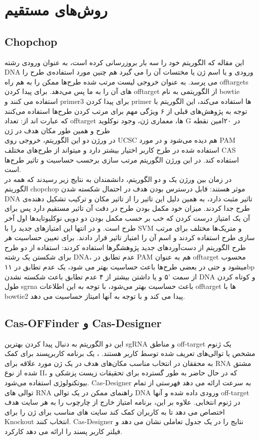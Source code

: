 \documentclass[12pt,a4paper,BCOR=.7cm,headsepline,bibliography=totoc]{report}
\begin{document}
\section{روش‌های مستقیم}
\subsection{Chopchop ~\cite{CHOPCHOP3,CHOPCHOP2,CHOPCHOP}}
این مقاله که الگوریتم خود را سه بار بروزرسانی کرده است، به عنوان ورودی رشته DNA ورودی و یا اسم ژن یا مختسات آن را می گیرد هم چنین مورد استفاده‌ی طرح را می پرسد. به عنوان خروجی لیست مرتب شده طرح‌ها ممکن را به هم راه offtargets های آن را به ما پس می‌دهد. برای پیدا کردن offtarget از الگوریتمی به نام bowtie استفاده می کنند و primer3 برای پیدا کردن primer ها استفاده می‌کند، این الگوریتم با توجه به پژوهش‌های قبلی از ۶ ویژگی مهم برای مرتب کردن طرح‌ها استفاده می‌کنند که عبارت اند از: تعداد offtarget ها، معماری ژن،  وجود نوکلوید G در ۲۰امین نقطه طرح و همین طور مکان هدف در ژن \\
در ورژن دو این الگوریتم، خروجی روی UCSC هم دیده می‌شود و در مورد PAM استفاده شده در طرح کاربر اختیار بیشتر دارد و میتواند از طرح‌های مختلف CAS استفاده کند. در این ورژن الگوریتم مرتب سازی برحسب حساسیت و تاثیر طرح‌ها است.\\
در زمان بین ورژن یک و دو الگوریتم، دانشمندان به نتایج زیر رسیدند که همه در الگوریتم chopchop موثر هستند: قابل درسترس بودن هدف در احتمال شکسته شدن DNA تاثیر مثبت دارد، به همین دلیل این تاثیر را از تاثیر مکان و ترکیب تشکیل دهنده‌ی طرح جدا کردند.
میزان خود مکمل بودن طرح در دقت آن تاثیر مستقیم دارد پس برای آن یک امتیاز درست کردن که خب بر حسب مکمل بودن دو دویی نوکلیوتاید‌ها اول آخر طرح است. و در انتها این امتیاز‌های جدید را با SVM و متریک‌ها مختلف برای مرتب سازی طرح استفاده کردند و اسم آن را امتیاز تاثیر قرار دادند.
برای تعیین حساسیت هر طرح الگوریتم از دست‌آورد‌های جدید پژوهشگر‌ها استفاده کردند: استفاده از دو طرح برای شکستن یک رشته DNA، عدم تطابق در PAM هم به عنوان offtarget محسوب میشود و حتی در بعضی طرح‌ها باعث حساسیت بهتر می شود، یک عدم تطابق در ۱۱bp از سمت ‍'۵ و یا داشتن بیشتر از ۴ عدم تطابق باعث شکسته نشدن  DNA و کوتاه کردن طول sgrna باعث حساسیت بهتر می‌شود، با توجه به این اطلاعات offtarget ها با bowtie2 پیدا می کند و با توجه به آنها امیتاز حساسیت می دهد.

\subsection{Cas-OFFinder و Cas-Designer ~\cite{Cas-OFFinder, Cas-Designer}}
این دو الگوریتم به دنبال پیدا کردن بهترین sgRNA و مناطق off-target یک ژنوم مشخص یا توالی‌های تعریف شده توسط کاربر هستند.
،
 یک برنامه کاربرپسند برای کمک به محققان در انتخاب مناسب مکان‌های هدف در یک ژن مورد علاقه برای RNA مشتق شده از نوع II، که در حال حاضر به طور گسترده برای تحقیقات زیست پزشکی و بیوتکنولوژی استفاده می‌شود. Cas-Designer به سرعت ارائه می دهد
فهرستی از تمام توالی های RNA راهنمای ممکن در یک توالی DNA ورودی داده شده و آنها off-target در ژنوم انتخابی. علاوه بر این، برنامه امتیاز خارج از چارچوب را به هر سایت هدف اختصاص می دهد تا به کاربران کمک کند سایت های مناسب برای ژن را برای Knockout انتخاب کنند.
 Cas-Designer نتایج را در یک جدول تعاملی نشان می دهد و فیلتر کاربر پسند را ارائه می دهد
کارکرد.
\end{document}

